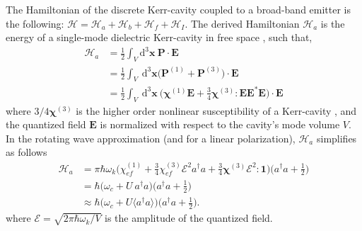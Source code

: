 \documentclass[12pt]{article}
\begin{document}
The Hamiltonian of the discrete Kerr-cavity coupled to a broad-band emitter is
the following: $\mathcal{H} = \mathcal{H}_{a} + \mathcal{H}_{b} + 
\mathcal{H}_{f} + \mathcal{H}_{I}$. The derived Hamiltonian $\mathcal{H}_{a}$ 
is the energy of a single-mode dielectric Kerr-cavity in free space 
\cite{jackson1999classical, hillery1984quantization}, such that,
\begin{equation}
\begin{split}
\mathcal{H}_{a} &= \frac{1}{2} 
    \int_{V} \mathrm{d}^{3}\mathbf{x} \: \mathbf{P} \cdot \mathbf{E}
\\
&= \frac{1}{2} 
    \int_{V} \: \mathrm{d}^{3}\mathbf{x}
    \Big( \mathbf{P}^{(1)} + \mathbf{P}^{(3)} \Big)
    \cdot \mathbf{E}
\\
&= \frac{1}{2} 
    \int_{V} \: \mathrm{d}^{3}\mathbf{x} \: 
    \Big( \bm\chi^{(1)} \mathbf{E}  + 
    \frac{3}{4}\bm\chi^{(3)}:\mathbf{E}\mathbf{E}^{*} \mathbf{E} \Big)
    \cdot \mathbf{E}
\end{split}
\end{equation}
where $3/4\mathbf{\chi}^{(3)}$ is the higher order nonlinear susceptibility of
a Kerr-cavity \cite{butcher1990elements}, and the quantized field $\mathbf{E}$
is normalized with respect to the cavity's mode volume $V$. In the rotating
wave approximation (and for a linear polarization), $\mathcal{H}_{a}$
simplifies as follows
\begin{equation}
\begin{split}
\mathcal{H}_{a} &= \pi\hbar\omega_k \Big(
    \chi^{(1)}_{ef} +
    \frac{3}{4} \chi^{(3)}_{ef} \mathcal{E}^2
    a^{\dagger}a + \frac{3}{4}\bm\chi^{(3)} \mathcal{E}^2 : \mathbf{1} \Big)
    \Big( a^{\dagger}a + \frac{1}{2} \Big)
\\
&= \hbar \Big( \omega_c + U\:a^{\dagger}a \Big)
    \Big( a^{\dagger}a + \frac{1}{2} \Big)
\\  
&\approx \hbar \Big( \omega_c + U \langle a^{\dagger}a \rangle \Big)
    \Big( a^{\dagger}a + \frac{1}{2} \Big).
\end{split}
\end{equation}
where $\mathcal{E} = \sqrt{2\pi \hbar \omega_k / V }$ is the amplitude of the
quantized field.
\end{document}
